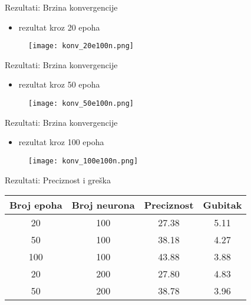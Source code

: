 \documentclass[table]{beamer}
\begin{document}
\begin{frame}{Rezultati: Brzina konvergencije}
\begin{itemize}
    \item rezultat kroz 20 epoha
\end{itemize}
\begin{figure}
    \centering
    \texttt{[image: konv\_20e100n.png]}
\end{figure}
    
\end{frame}

\begin{frame}{Rezultati: Brzina konvergencije}
\begin{itemize}
    \item rezultat kroz 50 epoha
\end{itemize}
\begin{figure}
    \centering
    \texttt{[image: konv\_50e100n.png]}
\end{figure}
    
\end{frame}

\begin{frame}{Rezultati: Brzina konvergencije}
\begin{itemize}
    \item rezultat kroz 100 epoha
\end{itemize}
\begin{figure}
    \centering
    \texttt{[image: konv\_100e100n.png]}
\end{figure}
    
\end{frame}


\begin{frame}{Rezultati: Preciznost i greška}
\begin{table}[]
 
    \begin{tabular}{|| c c c c ||}
    \hline
    \rowcolor{lightgray!50}Broj epoha & Broj neurona & Preciznost & Gubitak \\
    \hline\hline
    \rowcolor{orange!50} 20 & 100 & 27.38 & 5.11 \\
    \rowcolor{orange!70} 50 & 100 & 38.18  & 4.27 \\
    \rowcolor{orange}100 & 100 & 43.88 & 3.88 \\
    \rowcolor{orange!50}20 & 200 & 27.80 & 4.83 \\
    \rowcolor{orange!70} 50 & 200 & 38.78 & 3.96 \\
     \hline
    \end{tabular}
    
\end{table}
\end{frame}
\end{document}
